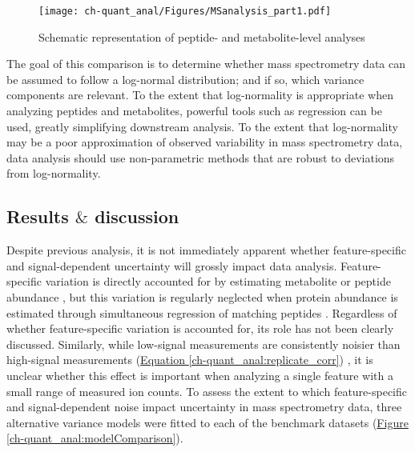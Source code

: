 \begin{figure}[h!]
\begin{center}
\texttt{[image: ch-quant\_anal/Figures/MSanalysis\_part1.pdf]}
\caption[Schematic representation of peptide-level and metabolite-level analyses]{Schematic representation of peptide- and metabolite-level analyses}
\label{ch-quant_anal:MSworkflow_p1}
\end{center}
\end{figure}

The goal of this comparison is to determine whether mass spectrometry data can be assumed to follow a log-normal distribution; and if so, which variance components are relevant. To the extent that log-normality is appropriate when analyzing peptides and metabolites, powerful tools such as regression can be used, greatly simplifying downstream analysis. To the extent that log-normality may be a poor approximation of observed variability in mass spectrometry data, data analysis should use non-parametric methods that are robust to deviations from log-normality.

\subsection{Results $\&$ discussion}

Despite previous analysis, it is not immediately apparent whether feature-specific and signal-dependent uncertainty will grossly impact data analysis. Feature-specific variation is directly accounted for by estimating metabolite or peptide abundance \cite{Costenoble:2011hia, Boer:2010fb}, but this variation is regularly neglected when protein abundance is estimated through simultaneous regression of matching peptides \cite{Oberg:2012bm}. Regardless of whether feature-specific variation is accounted for, its role has not been clearly discussed. Similarly, while low-signal measurements are consistently noisier than high-signal measurements (\hyperref[ch-quant_anal:replicate_corr]{Equation \ref{ch-quant_anal:replicate_corr}}) \cite{Zhu:2011jr,Oberg:2012bm,Navarro:2014ke}, it is unclear whether this effect is important when analyzing a single feature with a small range of measured ion counts. To assess the extent to which feature-specific and signal-dependent noise impact uncertainty in mass spectrometry data, three alternative variance models were fitted to each of the benchmark datasets (\hyperref[ch-quant_anal:modelComparison]{Figure \ref{ch-quant_anal:modelComparison}}). 

